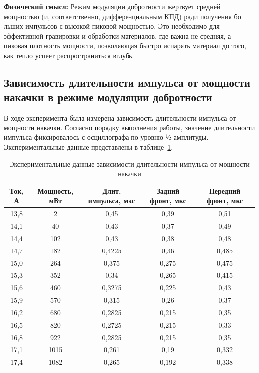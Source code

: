 \documentclass[12pt, a4paper]{article}
\begin{document}
\textbf{Физический смысл:} Режим модуляции добротности жертвует средней мощностью (и, соответственно, дифференциальным КПД) ради получения б$\acute{\text{о}}$льших импульсов с высокой пиковой мощностью. Это необходимо для эффективной гравировки и обработки материалов, где важна не средняя, а пиковая плотность мощности, позволяющая быстро испарять материал до того, как тепло успеет распространиться вглубь.






\subsection*{Зависимость длительности импульса от мощности накачки в режиме модуляции добротности}

В ходе эксперимента была измерена зависимость длительности импульса от мощности накачки. Согласно порядку выполнения работы, значение длительности импульса фиксировалось с осциллографа по уровню ½ амплитуды. Экспериментальные данные представлены в таблице~\ref{tab:pulse_duration_data}.

\begin{table}[H]
    \centering
    \caption{Экспериментальные данные зависимости длительности импульса от мощности накачки}
    \label{tab:pulse_duration_data}
    \begin{tabular}{|c|c|c|c|c|}
        \hline
        Ток, А & Мощность, мВт & Длит. импульса, мкс & Задний фронт, мкс & Передний фронт, мкс \\
        \hline
        13{,}8 & 2 & 0{,}45 & 0{,}39 & 0{,}51 \\
        14{,}1 & 40 & 0{,}43 & 0{,}37 & 0{,}49 \\
        14{,}4 & 102 & 0{,}43 & 0{,}38 & 0{,}48 \\
        14{,}7 & 182 & 0{,}4225 & 0{,}36 & 0{,}485 \\
        15{,}0 & 264 & 0{,}375 & 0{,}275 & 0{,}475 \\
        15{,}3 & 352 & 0{,}34 & 0{,}265 & 0{,}415 \\
        15{,}6 & 460 & 0{,}3275 & 0{,}225 & 0{,}43 \\
        15{,}9 & 570 & 0{,}315 & 0{,}26 & 0{,}37 \\
        16{,}2 & 680 & 0{,}2825 & 0{,}215 & 0{,}35 \\
        16{,}5 & 820 & 0{,}2725 & 0{,}215 & 0{,}33 \\
        16{,}8 & 922 & 0{,}2825 & 0{,}215 & 0{,}35 \\
        17{,}1 & 1015 & 0{,}261 & 0{,}19 & 0{,}332 \\
        17{,}4 & 1082 & 0{,}265 & 0{,}192 & 0{,}338 \\
        \hline
    \end{tabular}
\end{table}
\end{document}
